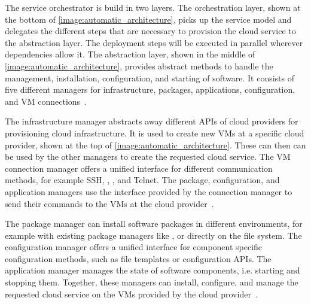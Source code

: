The service orchestrator is build in two layers.
The orchestration layer, shown at the bottom of \autoref{image:automatic_architecture}, picks up the service model and delegates the different steps that are necessary to provision the cloud service to the abstraction layer.
The deployment steps will be executed in parallel wherever dependencies allow it.
The abstraction layer, shown in the middle of \autoref{image:automatic_architecture}, provides abstract methods to handle the management, installation, configuration, and starting of software.
It consists of five different managers for infrastructure, packages, applications, configuration, and VM connections~\autocite{provisioning:architecture}.

The infrastructure manager abstracts away different APIs of cloud providers for provisioning cloud infrastructure.
It is used to create new VMs at a specific cloud provider, shown at the top of \autoref{image:automatic_architecture}.
These can then can be used by the other managers to create the requested cloud service.
The VM connection manager offers a unified interface for different communication methods, for example SSH, , , and Telnet.
The package, configuration, and application managers use the interface provided by the connection manager to send their commands to the VMs at the cloud provider~\autocite{provisioning:architecture}.

The package manager can install software packages in different environments, for example with existing package managers like , or directly on the file system.
The configuration manager offers a unified interface for component specific configuration methods, such as file templates or configuration APIs.
The application manager manages the state of software components, i.e. starting and stopping them.
Together, these managers can install, configure, and manage the requested cloud service on the VMs provided by the cloud provider~\autocite{provisioning:architecture}.
